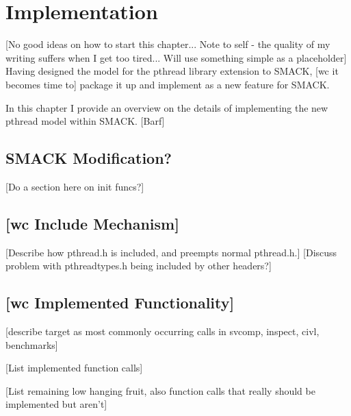\chapter{Implementation}\label{ch:implementation}
[No good ideas on how to start this chapter...  Note to self - the
quality of my writing suffers when I get too tired...  Will use
something simple as a placeholder]
Having designed the model for the pthread library extension to SMACK,
[wc it becomes time to] package it up and implement as a new feature
for SMACK.

In this chapter I provide an overview on the details of implementing
the new pthread model within SMACK.  [Barf]  

\section{SMACK Modification?}
[Do a section here on init funcs?]

\section{[wc Include Mechanism]}
[Describe how pthread.h is included, and preempts normal pthread.h.]
[Discuss problem with pthreadtypes.h being included by other headers?]

\section{[wc Implemented Functionality]}
[describe target as most commonly occurring calls in svcomp, inspect,
civl, benchmarks]

[List implemented function calls]

[List remaining low hanging fruit, also function calls that really
should be implemented but aren't]


